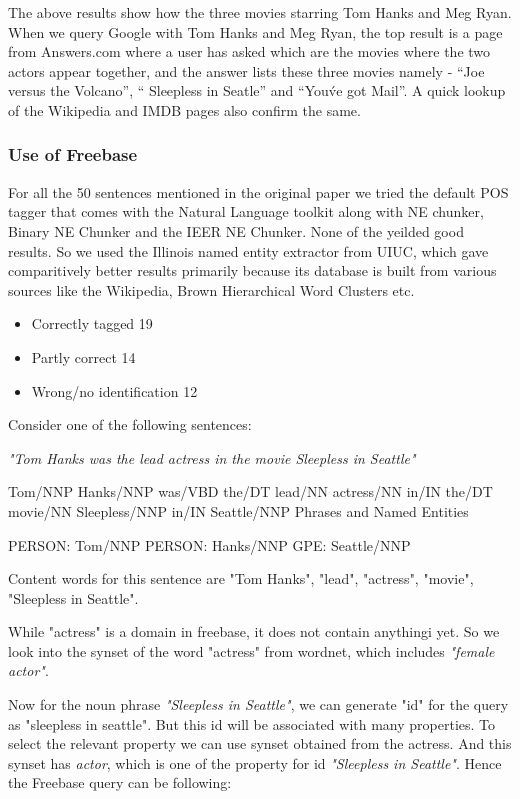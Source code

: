 \documentclass[11pt]{article}
\begin{document}
The above results show how the three movies starring Tom Hanks and Meg Ryan.
When we query Google with Tom Hanks and Meg Ryan, the top result is a page from
Answers.com where a user has asked which are the movies where the two actors
appear together, and the answer lists these three movies namely - ``Joe versus
the Volcano'', `` Sleepless in Seatle'' and ``You\'ve got Mail''. A quick lookup
of the Wikipedia and IMDB pages also confirm the same. 


\subsubsection{Use of Freebase}

For all the 50 sentences mentioned in the original paper we tried the default POS tagger that comes with the Natural Language toolkit along with NE chunker, Binary NE Chunker and the IEER NE Chunker. None of the yeilded good results. So we used the Illinois named entity extractor from UIUC, which gave comparitively better results primarily because its database is built from various sources like the Wikipedia, Brown Hierarchical Word Clusters etc. 

\begin{itemize}
\item Correctly tagged 19
\item Partly correct 14	
\item Wrong/no identification 12
\end{itemize}



Consider one of the following sentences:

\emph{"Tom Hanks was the lead actress in the movie Sleepless in Seattle"}

Tom/NNP Hanks/NNP was/VBD the/DT lead/NN actress/NN in/IN the/DT movie/NN Sleepless/NNP in/IN Seattle/NNP
Phrases and Named Entities

PERSON:
    Tom/NNP
PERSON:
    Hanks/NNP
GPE:
    Seattle/NNP

Content words for this sentence are "Tom Hanks", "lead", "actress", "movie", "Sleepless in Seattle". 

While "actress" is a domain in freebase, it does not contain anythingi yet. So we look into the synset of the word "actress" from wordnet, which includes \emph{"female actor"}.

Now for the noun phrase \emph{"Sleepless in Seattle"}, we can generate "id" for the query as "sleepless in seattle". But this id will be associated with many properties. To select the relevant property we can use synset obtained from the actress. And this synset has {\em actor}, which is one of the property for id {\em "Sleepless in Seattle"}. Hence the Freebase query can be following:
\end{document}

